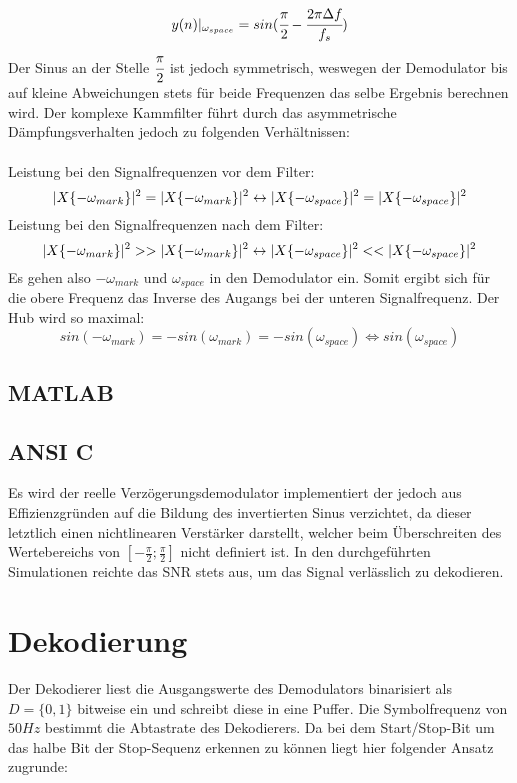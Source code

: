 \documentclass{article}
\begin{document}
$$
y(n)\arrowvert_{\omega_{space}} = sin(\cfrac{\pi}{2}-\cfrac{2 \pi \Delta f}{f_s})
$$
Der Sinus an der Stelle $\cfrac{\pi}{2}$ ist jedoch symmetrisch, weswegen der Demodulator bis auf kleine Abweichungen stets für beide Frequenzen das selbe Ergebnis berechnen wird. Der komplexe Kammfilter führt durch das asymmetrische Dämpfungsverhalten jedoch zu folgenden Verhältnissen:\\\\
Leistung bei den Signalfrequenzen vor dem Filter:
$$
\arrowvert X \{ -\omega_{mark} \} \arrowvert^2 = \arrowvert X \{ -\omega_{mark} \} \arrowvert^2 \leftrightarrow \arrowvert X \{ -\omega_{space} \} \arrowvert^2 = \arrowvert X \{ -\omega_{space} \} \arrowvert^2
$$
Leistung bei den Signalfrequenzen nach dem Filter:
$$
\arrowvert X \{ -\omega_{mark} \} \arrowvert^2 >> \arrowvert X \{ -\omega_{mark} \} \arrowvert^2 \leftrightarrow \arrowvert X \{ -\omega_{space} \} \arrowvert^2 << \arrowvert X \{ -\omega_{space} \} \arrowvert^2
$$
Es gehen also $-\omega_{mark}$ und $\omega_{space}$ in den Demodulator ein.
Somit ergibt sich für die obere Frequenz das Inverse des Augangs bei der unteren Signalfrequenz. Der Hub wird so maximal:
$$
sin(-\omega_{mark}) = -sin(\omega_{mark}) = -sin(\omega_{space}) \Longleftrightarrow sin(\omega_{space})
$$
\subsection{MATLAB}

\subsection{ANSI C}
Es wird der reelle Verzögerungsdemodulator implementiert der jedoch aus Effizienzgründen auf die Bildung des invertierten Sinus verzichtet, da dieser letztlich einen nichtlinearen Verstärker darstellt, welcher beim Überschreiten des Wertebereichs von $[-\frac{\pi}{2};\frac{\pi}{2}]$ nicht definiert ist. In den durchgeführten Simulationen reichte das SNR stets aus, um das Signal verlässlich zu dekodieren.
\section{Dekodierung}

Der Dekodierer liest die Ausgangswerte des Demodulators binarisiert als $D = \{0,1\}$ bitweise ein und schreibt diese in eine Puffer. 
Die Symbolfrequenz von $50Hz$ bestimmt die Abtastrate des Dekodierers. Da bei dem Start/Stop-Bit um das
halbe Bit der Stop-Sequenz erkennen zu können liegt hier folgender Ansatz zugrunde:
\end{document}
